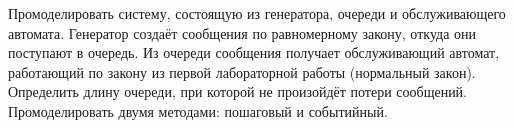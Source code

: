 Промоделировать систему, состоящую из генератора, очереди и обслуживающего автомата. Генератор создаёт сообщения по равномерному закону, откуда они поступают в очередь. Из очереди сообщения получает обслуживающий автомат, работающий по закону из первой лабораторной работы (нормальный закон). Определить длину очереди, при которой не произойдёт потери сообщений. Промоделировать двумя методами: пошаговый и событийный.